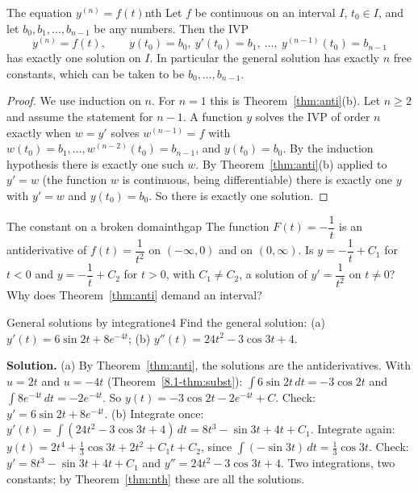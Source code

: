 \documentclass[11pt]{article}
\begin{document}
\begin{thm}{The equation $y^{(n)}=f(t)$}{nth}
Let $f$ be continuous on an interval $I$, $t_0\in I$, and let $b_0,b_1,\dots,b_{n-1}$ be any numbers. Then the IVP
\[
y^{(n)}=f(t),\qquad y(t_0)=b_0,\ y'(t_0)=b_1,\ \dots,\ y^{(n-1)}(t_0)=b_{n-1}
\]
has exactly one solution on $I$. In particular the general solution has exactly $n$ free constants, which can be taken to be $b_0,\dots,b_{n-1}$.
\end{thm}
\begin{proof}
We use induction on $n$. For $n=1$ this is Theorem~\ref{thm:anti}(b). Let $n\ge2$ and assume the statement for $n-1$. A function $y$ solves the IVP of order $n$ exactly when $w=y'$ solves $w^{(n-1)}=f$ with $w(t_0)=b_1,\dots,w^{(n-2)}(t_0)=b_{n-1}$, and $y(t_0)=b_0$. By the induction hypothesis there is exactly one such $w$. By Theorem~\ref{thm:anti}(b) applied to $y'=w$ (the function $w$ is continuous, being differentiable) there is exactly one $y$ with $y'=w$ and $y(t_0)=b_0$. So there is exactly one solution.
\end{proof}

\begin{think}{The constant on a broken domain}{thgap}
The function $F(t)=-\dfrac1t$ is an antiderivative of $f(t)=\dfrac1{t^2}$ on $(-\infty,0)$ and on $(0,\infty)$. Is $y=-\dfrac1t+C_1$ for $t<0$ and $y=-\dfrac1t+C_2$ for $t>0$, with $C_1\ne C_2$, a solution of $y'=\dfrac1{t^2}$ on $t\ne0$? Why does Theorem~\ref{thm:anti} demand an interval?
\end{think}

\begin{exmp}{General solutions by integration}{e4}
Find the general solution: (a) $y'(t)=6\sin2t+8e^{-4t}$; (b) $y''(t)=24t^2-3\cos3t+4$.

\textbf{Solution.} (a) By Theorem~\ref{thm:anti}, the solutions are the antiderivatives. With $u=2t$ and $u=-4t$ (Theorem~\ref{8.1-thm:subst}): $\int6\sin2t\,dt=-3\cos2t$ and $\int8e^{-4t}\,dt=-2e^{-4t}$. So $y(t)=-3\cos2t-2e^{-4t}+C$. Check: $y'=6\sin2t+8e^{-4t}$.
(b) Integrate once: $y'(t)=\int(24t^2-3\cos3t+4)\,dt=8t^3-\sin3t+4t+C_1$. Integrate again: $y(t)=2t^4+\frac13\cos3t+2t^2+C_1t+C_2$, since $\int(-\sin3t)\,dt=\frac13\cos3t$. Check: $y'=8t^3-\sin3t+4t+C_1$ and $y''=24t^2-3\cos3t+4$. Two integrations, two constants; by Theorem~\ref{thm:nth} these are all the solutions.
\end{exmp}
\end{document}
